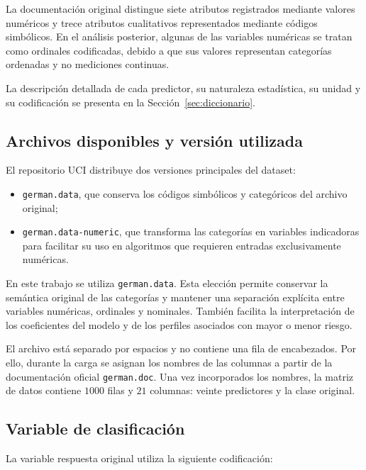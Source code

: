 La documentación original distingue siete atributos registrados mediante
valores numéricos y trece atributos cualitativos representados mediante
códigos simbólicos. En el análisis posterior, algunas de las variables
numéricas se tratan como ordinales codificadas, debido a que sus valores
representan categorías ordenadas y no mediciones continuas.

La descripción detallada de cada predictor, su naturaleza estadística,
su unidad y su codificación se presenta en la
Sección~\ref{sec:diccionario}.

\subsection{Archivos disponibles y versión utilizada}

El repositorio UCI distribuye dos versiones principales del dataset:

\begin{itemize}
    \item \texttt{german.data}, que conserva los códigos simbólicos y
    categóricos del archivo original;

    \item \texttt{german.data-numeric}, que transforma las categorías en
    variables indicadoras para facilitar su uso en algoritmos que
    requieren entradas exclusivamente numéricas.
\end{itemize}

En este trabajo se utiliza \texttt{german.data}. Esta elección permite
conservar la semántica original de las categorías y mantener una
separación explícita entre variables numéricas, ordinales y nominales.
También facilita la interpretación de los coeficientes del modelo y de
los perfiles asociados con mayor o menor riesgo.

El archivo está separado por espacios y no contiene una fila de
encabezados. Por ello, durante la carga se asignan los nombres de las
columnas a partir de la documentación oficial \texttt{german.doc}. Una
vez incorporados los nombres, la matriz de datos contiene \(1000\) filas
y \(21\) columnas: veinte predictores y la clase original.

\subsection{Variable de clasificación}

La variable respuesta original utiliza la siguiente codificación:

